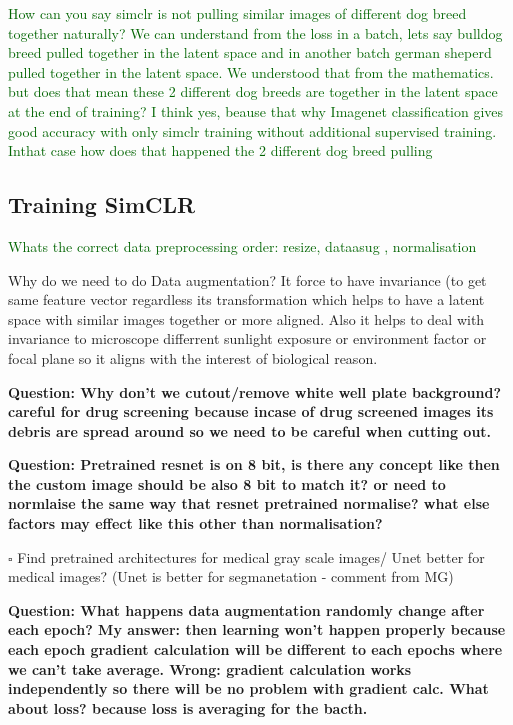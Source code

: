 \documentclass[12pt,twoside,a4paper,parskip]{scrbook} %
\begin{document}
\textcolor{darkgreen}{How can you say simclr is not pulling similar images of different dog breed together naturally? We can understand from the loss in a batch, lets say bulldog breed pulled together in the latent space and in another batch german sheperd pulled together in the latent space. We understood that from the mathematics. but does that mean these 2 different dog breeds are together in the latent space at the end of training? I think yes, beause that why Imagenet classification gives good accuracy with only simclr training without additional supervised training.  Inthat case how does that happened the 2 different dog breed pulling}


\subsection{Training SimCLR}

\textcolor{darkgreen}{Whats the correct data preprocessing order: resize, dataasug , normalisation}

Why do we need to do Data augmentation? It force to have invariance (to get same feature vector regardless its transformation which helps to have a latent space with similar images together or more aligned. Also it helps to deal with invariance to microscope differrent sunlight exposure or environment factor or focal plane so it aligns with the interest of biological reason.

\textbf{Question: Why don't we cutout/remove white well plate background? careful for drug screening because incase of drug screened images its debris are spread around so we need to be careful when cutting out.}

\textbf{Question: Pretrained resnet is on 8 bit, is there any concept like then the custom image should be also 8 bit to match it? or need to normlaise the same way that resnet pretrained normalise? what else factors may effect like this other than normalisation? } 

$\square$ Find pretrained architectures for medical gray scale images/ Unet better for medical images? (Unet is better for segmanetation - comment from MG)

\textbf{Question: What happens data augmentation randomly change after each epoch? My answer: then learning won't happen properly because each epoch gradient calculation will be different to each epochs where we can't take average. Wrong: gradient calculation works independently so there will be no problem with gradient calc. What about loss? because loss is averaging for the bacth.} 
\end{document}
